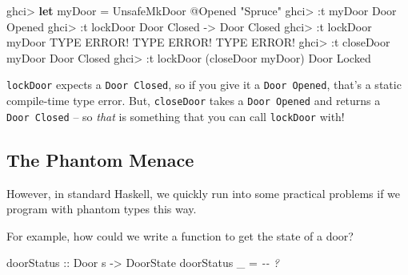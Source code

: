 \documentclass[]{article}
\newenvironment{Shaded}{}{}
\newcommand{\CommentTok}[1]{\textcolor[rgb]{0.38,0.63,0.69}{\textit{#1}}}
\newcommand{\DataTypeTok}[1]{\textcolor[rgb]{0.56,0.13,0.00}{#1}}
\newcommand{\KeywordTok}[1]{\textcolor[rgb]{0.00,0.44,0.13}{\textbf{#1}}}
\newcommand{\NormalTok}[1]{#1}
\newcommand{\OperatorTok}[1]{\textcolor[rgb]{0.40,0.40,0.40}{#1}}
\newcommand{\OtherTok}[1]{\textcolor[rgb]{0.00,0.44,0.13}{#1}}
\newcommand{\StringTok}[1]{\textcolor[rgb]{0.25,0.44,0.63}{#1}}
\begin{document}
\begin{Shaded}
\begin{Highlighting}[]
\NormalTok{ghci}\OperatorTok{\textgreater{}} \KeywordTok{let}\NormalTok{ myDoor }\OtherTok{=} \DataTypeTok{UnsafeMkDoor} \OperatorTok{@}\DataTypeTok{\textquotesingle{}Opened} \StringTok{"Spruce"}
\NormalTok{ghci}\OperatorTok{\textgreater{}} \OperatorTok{:}\NormalTok{t myDoor}
\DataTypeTok{Door} \DataTypeTok{\textquotesingle{}Opened}
\NormalTok{ghci}\OperatorTok{\textgreater{}} \OperatorTok{:}\NormalTok{t lockDoor}
\DataTypeTok{Door} \DataTypeTok{\textquotesingle{}Closed} \OtherTok{{-}\textgreater{}} \DataTypeTok{Door} \DataTypeTok{\textquotesingle{}Closed}
\NormalTok{ghci}\OperatorTok{\textgreater{}} \OperatorTok{:}\NormalTok{t lockDoor myDoor}
\DataTypeTok{TYPE} \DataTypeTok{ERROR}\OperatorTok{!}  \DataTypeTok{TYPE} \DataTypeTok{ERROR}\OperatorTok{!}  \DataTypeTok{TYPE} \DataTypeTok{ERROR}\OperatorTok{!}
\NormalTok{ghci}\OperatorTok{\textgreater{}} \OperatorTok{:}\NormalTok{t closeDoor myDoor}
\DataTypeTok{Door} \DataTypeTok{\textquotesingle{}Closed}
\NormalTok{ghci}\OperatorTok{\textgreater{}} \OperatorTok{:}\NormalTok{t lockDoor (closeDoor myDoor)}
\DataTypeTok{Door} \DataTypeTok{\textquotesingle{}Locked}
\end{Highlighting}
\end{Shaded}

\texttt{lockDoor} expects a \texttt{Door\ \textquotesingle{}Closed}, so if you
give it a \texttt{Door\ \textquotesingle{}Opened}, that's a static compile-time
type error. But, \texttt{closeDoor} takes a
\texttt{Door\ \textquotesingle{}Opened} and returns a
\texttt{Door\ \textquotesingle{}Closed} -- so \emph{that} is something that you
can call \texttt{lockDoor} with!

\subsection{The Phantom Menace}\label{the-phantom-menace}

However, in standard Haskell, we quickly run into some practical problems if we
program with phantom types this way.

For example, how could we write a function to get the state of a door?

\begin{Shaded}
\begin{Highlighting}[]
\OtherTok{doorStatus ::} \DataTypeTok{Door}\NormalTok{ s }\OtherTok{{-}\textgreater{}} \DataTypeTok{DoorState}
\NormalTok{doorStatus \_ }\OtherTok{=} \CommentTok{{-}{-} ?}
\end{Highlighting}
\end{Shaded}
\end{document}
